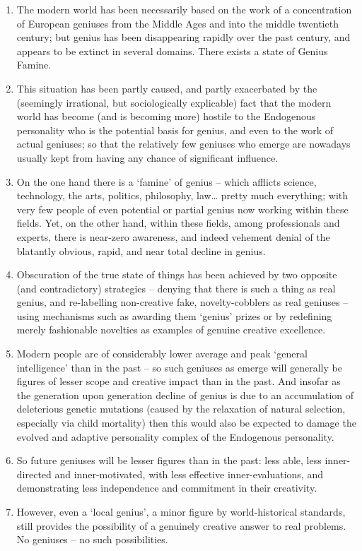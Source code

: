 \documentclass[
]{book}
\begin{document}
\begin{enumerate}
\def\labelenumi{\arabic{enumi}.}
\item
  The modern world has been necessarily based on the work of a concentration of European geniuses from the Middle Ages and into the middle twentieth century; but genius has been disappearing rapidly over the past century, and appears to be extinct in several domains. There exists a state of Genius Famine.
\item
  This situation has been partly caused, and partly exacerbated by the (seemingly irrational, but sociologically explicable) fact that the modern world has become (and is becoming more) hostile to the Endogenous personality who is the potential basis for genius, and even to the work of actual geniuses; so that the relatively few geniuses who emerge are nowadays usually kept from having any chance of significant influence.
\item
  On the one hand there is a `famine' of genius -- which afflicts science, technology, the arts, politics, philosophy, law\ldots{} pretty much everything; with very few people of even potential or partial genius now working within these fields. Yet, on the other hand, within these fields, among professionals and experts, there is near-zero awareness, and indeed vehement denial of the blatantly obvious, rapid, and near total decline in genius.
\item
  Obscuration of the true state of things has been achieved by two opposite (and contradictory) strategies -- denying that there is such a thing as real genius, and re-labelling non-creative fake, novelty-cobblers as real geniuses -- using mechanisms such as awarding them `genius' prizes or by redefining merely fashionable novelties as examples of genuine creative excellence.
\item
  Modern people are of considerably lower average and peak `general intelligence' than in the past -- so such geniuses as emerge will generally be figures of lesser scope and creative impact than in the past. And insofar as the generation upon generation decline of genius is due to an accumulation of deleterious genetic mutations (caused by the relaxation of natural selection, especially via child mortality) then this would also be expected to damage the evolved and adaptive personality complex of the Endogenous personality.
\item
  So future geniuses will be lesser figures than in the past: less able, less inner-directed and inner-motivated, with less effective inner-evaluations, and demonstrating less independence and commitment in their creativity.
\item
  However, even a `local genius', a minor figure by world-historical standards, still provides the possibility of a genuinely creative answer to real problems. No geniuses -- no such possibilities.
\end{enumerate}
\end{document}
